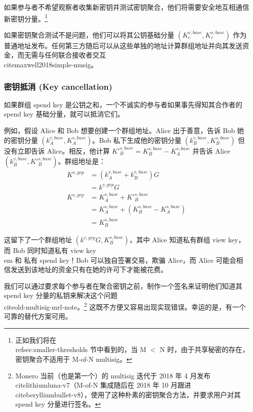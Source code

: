 如果参与者不希望观察者收集新密钥并测试密钥聚合，他们将需要安全地互相通信新密钥分量。\footnote{正如我们将在 \\ref{sec:smaller-thresholds} 节中看到的，当 M $<$ N 时，由于共享秘密的存在，密钥聚合不适用于 M-of-N multisig。}

如果密钥聚合测试不是问题，他们可以将其公钥基础分量 $(K^{v,base}_e,K^{s,base}_e)$ 作为普通地址发布。任何第三方随后可以从这些单独的地址计算群组地址并向其发送资金，而无需与任何联合接收者交互 \\cite{maxwell2018simple-musig}。

\subsubsection*{密钥抵消 (Key cancellation)}

如果群组 spend key 是公钥之和，一个不诚实的参与者如果事先得知其合作者的 spend key 基础分量，就可以抵消它们。

例如，假设 Alice 和 Bob 想要创建一个群组地址。Alice 出于善意，告诉 Bob 她的密钥分量 $(k^{v,base}_A,K^{s,base}_A)$。Bob 私下生成他的密钥分量 $(k^{v,base}_B,K^{s,base}_B)$ 但没有立即告诉 Alice。相反，他计算 $K'^{s,base}_B = K^{s,base}_B - K^{s,base}_A$ 并告诉 Alice $(k^{v,base}_B,K'^{s,base}_B)$。群组地址是：\vspace{.175cm}
\begin{align*}
    K^{v,grp} &= (k^{v,base}_A + k^{v,base}_B) G \\
             &= k^{v,grp} G\\
    K^{s,grp} &= K^{s,base}_A + K'^{s,base}_B \\
             &= K^{s,base}_A + (K^{s,base}_B - K^{s,base}_A)\\
             &= K^{s,base}_B
\end{align*}

这留下了一个群组地址 $(k^{v,grp} G,K^{s,base}_B)$，其中 Alice 知道私有群组 view key，而 Bob 同时知道私有 view key {\\em 和} 私有 spend key！Bob 可以独自签署交易，欺骗 Alice，而 Alice 可能会相信发送到该地址的资金只有在她的许可下才能被花费。

我们可以通过要求每个参与者在聚合密钥之前，制作一个签名来证明他们知道其 spend key 分量的私钥来解决这个问题 \\cite{old-multisig-mrl-note}。\footnote{Monero 当前（也是第一个）的 multisig 迭代于 2018 年 4 月发布 \\cite{lithiumluna-v7}（M-of-N 集成随后在 2018 年 10 月跟进 \\cite{berylliumbullet-v8}），使用了这种朴素的密钥聚合方法，并要求用户对其 spend key 分量进行签名。} 这既不方便又容易出现实现错误。幸运的是，有一个可靠的替代方案可用。


